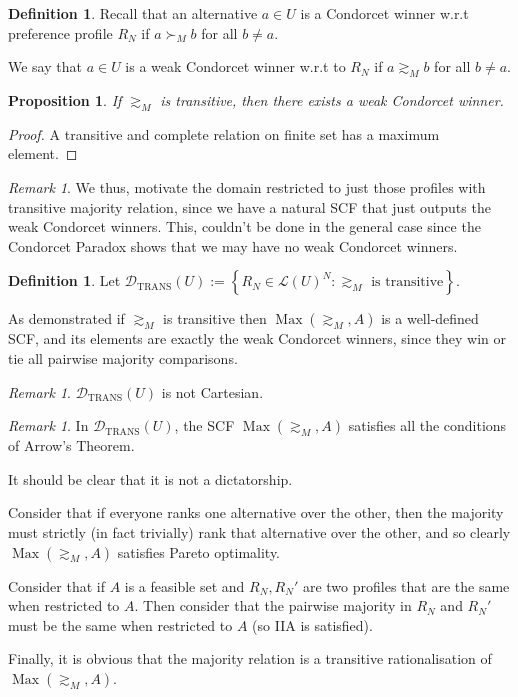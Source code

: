 \documentclass{book}
\theoremstyle{plain}
\newtheorem{proposition}[theorem]{Proposition}
\theoremstyle{definition}
\newtheorem{definition}[theorem]{Definition}
\theoremstyle{remark}
\newtheorem{remark}[theorem]{Remark}
\newcommand{\set}[1]{\left\{#1\right\}}
\begin{document}
\begin{definition}
    Recall that an alternative $a \in U$ is 
    a Condorcet winner w.r.t preference profile 
    $R_N$ if $a \succ_M b$ for all $b \neq a$.

    We say that $a \in U$ is a weak Condorcet winner 
    w.r.t to $R_N$ if $a \gtrsim_M b$ for all $b \neq a$.
\end{definition}

\begin{proposition}
    If $\gtrsim_M$ is transitive, then 
    there exists a weak Condorcet winner.
\end{proposition}
\begin{proof}
    A transitive and complete relation on finite set has a maximum element.
\end{proof}

\begin{remark}
    We thus, motivate the domain 
    restricted to 
    just those profiles with transitive majority relation,
    since we have a natural SCF that just outputs
    the weak Condorcet winners.
    This, couldn't be done in the general case since 
    the Condorcet Paradox shows that we may have no 
    weak Condorcet winners.
\end{remark}

\begin{definition}
    Let $\mathcal{D}_{\text{TRANS}}(U) := \set{R_N \in \mathcal{L}(U)^N : \gtrsim_M \text{ is transitive}}$.

    As demonstrated if 
    $\gtrsim_M$ is transitive then
    $\operatorname{Max}(\gtrsim_M, A)$ is a well-defined SCF, 
    and its elements are exactly the weak Condorcet winners, 
    since they win or tie all pairwise majority comparisons.
\end{definition}

\begin{remark}
    $\mathcal{D}_{\text{TRANS}}(U)$ is not Cartesian.
\end{remark}

\begin{remark}
    In $\mathcal{D}_{\text{TRANS}}(U)$,
    the SCF $\operatorname{Max}(\gtrsim_M, A)$ 
    satisfies all the conditions of 
    Arrow's Theorem.
    
    It should be clear that 
    it is not a dictatorship.

    Consider that if everyone ranks 
    one alternative over the other, 
    then 
    the majority must 
    strictly (in fact trivially) rank 
    that alternative over the other,
    and so clearly 
    $\operatorname{Max}(\gtrsim_M, A)$ satisfies Pareto optimality.

    Consider that if $A$
    is a feasible set and 
    $R_N, R_N'$ are two profiles that are the same when 
    restricted to $A$.
    Then consider that the pairwise majority
    in $R_N$ and $R_N'$ must be the same when restricted to $A$ (so IIA is satisfied).

    Finally, it is obvious that 
    the majority relation is a transitive 
    rationalisation of $\operatorname{Max}(\gtrsim_M, A)$.
\end{remark}
\end{document}
